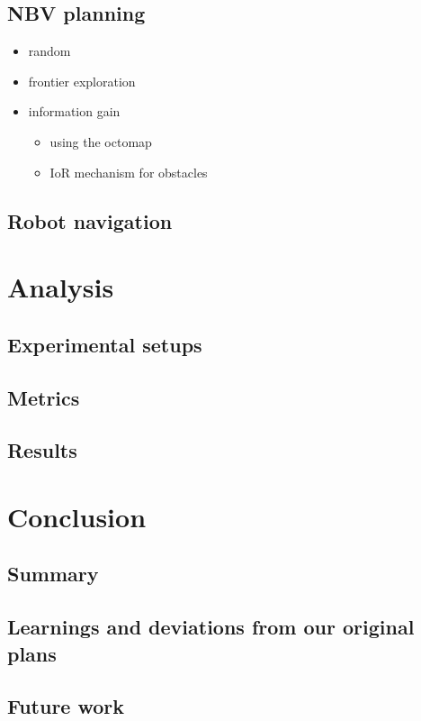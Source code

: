 \documentclass[a4paper,11pt,english]{article}
\begin{document}
\subsection{NBV planning}

\begin{itemize}
	\item random
	\item frontier exploration
	\item information gain
	\begin{itemize}
	\item using the octomap
	\item IoR mechanism for obstacles
	\end{itemize}
\end{itemize}

\subsection{Robot navigation}

\section{Analysis}

\subsection{Experimental setups}
\subsection{Metrics}
\subsection{Results}

\section{Conclusion}

\subsection{Summary}
\subsection{Learnings and deviations from our original plans}
\subsection{Future work}

\newpage


\end{document}

